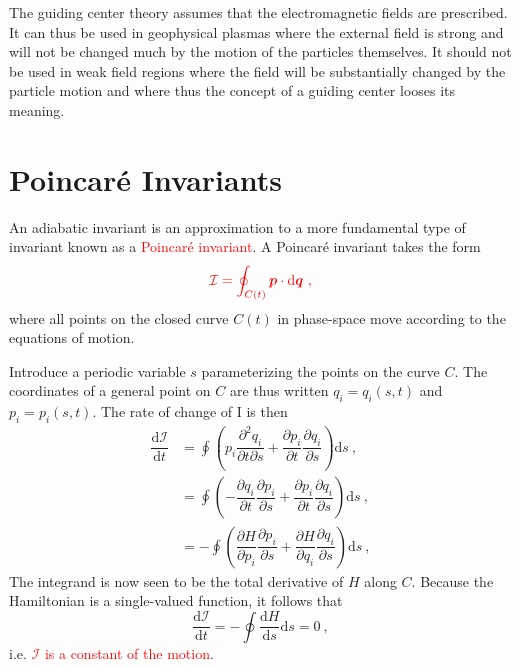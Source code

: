 \documentclass[12pt,a4paper]{article}
\renewcommand{\vec}[1]{\boldsymbol{#1}}
\newcommand{\dif}{\mathrm{d}}
\newcounter{theo}[section]\setcounter{theo}{0}
\begin{document}
The guiding center theory assumes that the electromagnetic fields are prescribed. It can thus be used in geophysical plasmas where the external field is strong and will not be changed much by the motion of the particles themselves. It should not be used in weak field regions where the field will be substantially changed by the particle motion and where thus the concept of a guiding center looses its meaning.


\section{Poincar\'e Invariants}
\cite{Plasma2014} An adiabatic invariant is an approximation to a more fundamental type of invariant known as a \textcolor{red}{Poincar\'e invariant}. A Poincar\'e invariant takes the form
\begin{equation}
\color{red} \mathcal I = \oint_{C(t)} \vec{p}\cdot \dif \vec{q} ~,
\end{equation}
where all points on the closed curve $C(t)$ in phase-space move according to the equations of motion. 

Introduce a periodic variable $s$ parameterizing the points on the curve $C$. The coordinates of a general point on $C$ are thus written $q_i = q_i(s, t)$ and $p_i = p_i(s, t)$. The rate of change of I is then
\begin{align}
\nonumber \dfrac{\dif \mathcal I}{\dif t} &= \oint \left(p_i \dfrac{\partial^2 q_i}{\partial t \partial s} +\dfrac{\partial p_i}{\partial t} \dfrac{\partial q_i}{\partial s} \right) \dif s ~, \\
&= \oint \left(- \dfrac{\partial q_i}{\partial t} \dfrac{\partial p_i}{\partial s} +\dfrac{\partial p_i}{\partial t} \dfrac{\partial q_i}{\partial s} \right) \dif s ~, \\
&= -\oint \left(\dfrac{\partial H}{\partial p_i} \dfrac{\partial p_i}{\partial s} +\dfrac{\partial H}{\partial q_i} \dfrac{\partial q_i}{\partial s} \right) \dif s ~,
\end{align}
The integrand is now seen to be the total derivative of $H$ along $C$. Because the Hamiltonian is a single-valued function, it follows that
\begin{equation}
\dfrac{\dif \mathcal I}{\dif t} = - \oint \dfrac{\dif H}{\dif s} \dif s =  0 ~,
\end{equation}
i.e. \textcolor{red}{$\mathcal I$ is a constant of the motion}.







\end{document}
